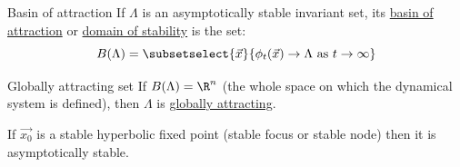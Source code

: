\documentclass[../Main.tex]{subfiles}
\begin{document}
\begin{definition}{Basin of attraction}
    If $\Lambda$ is an asymptotically stable invariant set, its \underline{basin of attraction} or \underline{domain of stability} is the set:
    \begin{equation*}
        B(\Lambda) = \subsetselect{\vec{x}}{\phi_t(\vec{x}) \to \Lambda \text{ as } t \to \infty}
    \end{equation*}
\end{definition}
\begin{definition}{Globally attracting set}
    If $B(\Lambda) = \R^n$ (the whole space on which the dynamical system is defined), then $\Lambda$ is \underline{globally attracting}.
\end{definition}
\begin{theorem}
    If $\vec{x_0}$ is a stable hyperbolic fixed point (stable focus or stable node) then it is asymptotically stable.
    \label{thmHyperbolicStability}
\end{theorem}
\end{document}
